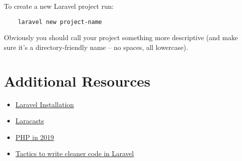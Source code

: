 To create a new Laravel project run:

\begin{verbatim}
    laravel new project-name
\end{verbatim}

Obviously you should call your project something more descriptive (and make sure it's a directory-friendly name – no spaces, all lowercase).


\section{Additional Resources}

\begin{itemize}[leftmargin=*]
    \item \href{https://laravel.com/docs/master/installation#installation}{Laravel Installation}
    \item \href{https://laracasts.com}{Laracasts}
    \item \href{https://stitcher.io/blog/php-in-2019}{PHP in 2019}
    \item \href{https://threadreaderapp.com/thread/1272822437181378561.html}{Tactics to write cleaner code in Laravel}
\end{itemize}

